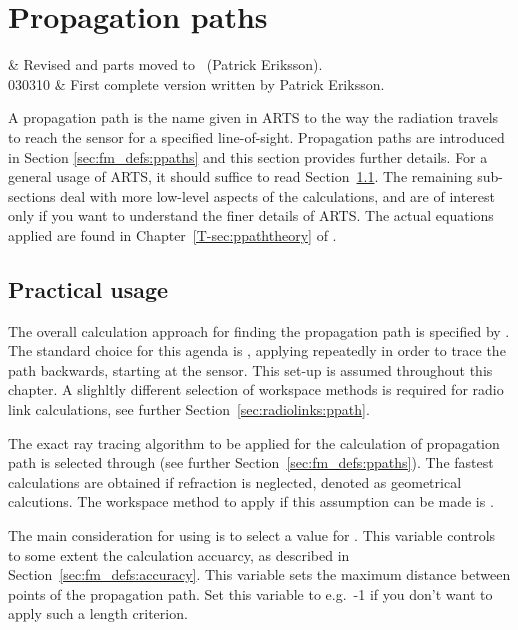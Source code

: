 \chapter{Propagation paths}
 \label{sec:ppath}


 & Revised and parts moved to \theory\ (Patrick Eriksson).\\
  030310 & First complete version written by Patrick Eriksson.\\
\stophistory


\graphicspath{{Figs/ppath/}}


A propagation path is the name given in ARTS to the way the radiation travels
to reach the sensor for a specified line-of-sight. Propagation paths are
introduced in Section \ref{sec:fm_defs:ppaths} and this section provides
further details. For a general usage of ARTS, it should suffice to read
Section~\ref{sec:ppath:usage}. The remaining sub-sections deal with more
low-level aspects of the calculations, and are of interest only if you want to
understand the finer details of ARTS. The actual equations applied are found in
Chapter~\ref{T-sec:ppaththeory} of \theory.


\section{Practical usage}
\label{sec:ppath:usage}

The overall calculation approach for finding the propagation path is specified
by . The standard choice for this agenda is
, applying 
repeatedly in order to trace the path backwards, starting at the sensor. This
set-up is assumed throughout this chapter. A slighltly different selection of
workspace methods is required for radio link calculations, see further
Section~\ref{sec:radiolinks:ppath}.

The exact ray tracing algorithm to be applied for the calculation of
propagation path is selected through 
(see further Section~\ref{sec:fm_defs:ppaths}). The fastest calculations are
obtained if refraction is neglected, denoted as geometrical calcutions. The
workspace method to apply if this assumption can be made is
.

The main consideration for using  is to select
a value for . This variable controls to some extent the
calculation accuarcy, as described in Section~\ref{sec:fm_defs:accuracy}. This
variable sets the maximum distance between points of the propagation
path. Set this variable to e.g.\ -1 if you don't want to apply such a length
criterion.


